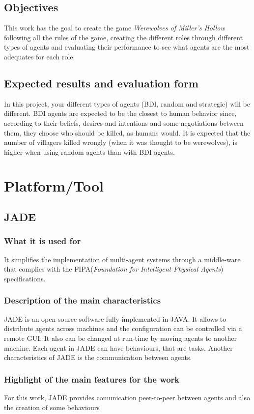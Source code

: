 \documentclass{article}
\begin{document}
\subsection{Objectives}
This work has the goal to create the game \textit{Werewolves of Miller’s Hollow} following all the rules of the game, creating the different roles through different types of agents and evaluating their performance to see what agents are the most adequates for each role. 
\subsection{Expected results and evaluation form}

In this project, your different types of agents (BDI, random and strategic) will be different. BDI agents are expected to be the closest to human behavior since, according to their beliefs, desires and intentions and some negotiations between them, they choose who should be killed, as humans would.
It is expected that the number of villagers killed wrongly (when it was thought to be werewolves), is higher when using random agents than with BDI agents.  

\section{Platform/Tool}
\subsection{JADE}
\subsubsection{What it is used for}
It simplifies the implementation of multi-agent systems through a middle-ware that complies with the FIPA(\textit{Foundation for Intelligent Physical Agents}) specifications.
\subsubsection{Description of the main characteristics}
JADE is an open source software fully implemented in JAVA. It allows to distribute agents across machines and the configuration can be controlled via a remote GUI. It also can be changed at run-time by moving agents to another machine. Each agent in JADE can have behaviours, that are tasks.
Another characteristics of JADE is the communication between agents.
\subsubsection{Highlight of the main features for the work}
For this work, JADE provides comunication peer-to-peer between agents and also the creation of some behaviours
\end{document}
